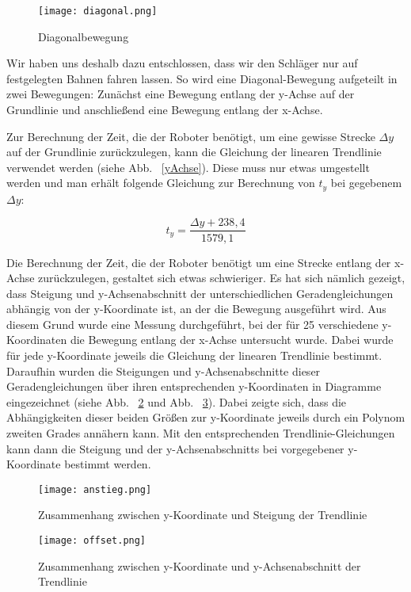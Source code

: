 \begin{figure}[htbp]
\centering
\texttt{[image: diagonal.png]}
\caption{Diagonalbewegung} 
\label{diagonal}
\end{figure} 

Wir haben uns deshalb dazu entschlossen, dass wir den Schläger nur auf festgelegten Bahnen fahren lassen. So wird eine Diagonal-Bewegung aufgeteilt in zwei Bewegungen: Zunächst eine Bewegung entlang der y-Achse auf der Grundlinie und anschließend eine Bewegung entlang der x-Achse. 

Zur Berechnung der Zeit, die der Roboter benötigt, um eine gewisse Strecke $ \Delta y $auf der Grundlinie zurückzulegen, kann die Gleichung der linearen Trendlinie verwendet werden (siehe Abb. ~\ref{yAchse}). Diese muss nur etwas umgestellt werden und man erhält folgende Gleichung zur Berechnung von $ t_y $ bei gegebenem $ \Delta y $:

\begin{equation}
t_y =\frac{\Delta y + 238,4}{1579,1}
\end{equation} 

Die Berechnung der Zeit, die der Roboter benötigt um eine Strecke entlang der x-Achse zurückzulegen, gestaltet sich etwas schwieriger. Es hat sich nämlich gezeigt, dass Steigung und y-Achsenabschnitt der unterschiedlichen Geradengleichungen abhängig von der y-Koordinate ist, an der die Bewegung ausgeführt wird. Aus diesem Grund wurde eine Messung durchgeführt, bei der für 25 verschiedene y-Koordinaten die Bewegung entlang der x-Achse untersucht wurde. Dabei wurde für jede y-Koordinate jeweils die Gleichung der linearen Trendlinie bestimmt. Daraufhin wurden die Steigungen und y-Achsenabschnitte dieser Geradengleichungen über ihren entsprechenden y-Koordinaten in Diagramme eingezeichnet (siehe Abb. ~\ref{anstieg} und Abb. ~\ref{offset}). Dabei zeigte sich, dass die Abhängigkeiten dieser beiden Größen zur y-Koordinate jeweils durch ein Polynom zweiten Grades annähern kann. Mit den entsprechenden Trendlinie-Gleichungen kann dann die Steigung und der y-Achsenabschnitts bei vorgegebener y-Koordinate bestimmt werden. 

\begin{figure}[htbp]
\centering
\texttt{[image: anstieg.png]}
\caption{Zusammenhang zwischen y-Koordinate und Steigung der Trendlinie} 
\label{anstieg}
\end{figure}

\begin{figure}[htbp]
\centering
\texttt{[image: offset.png]}
\caption{Zusammenhang zwischen y-Koordinate und y-Achsenabschnitt der Trendlinie} 
\label{offset}
\end{figure}

